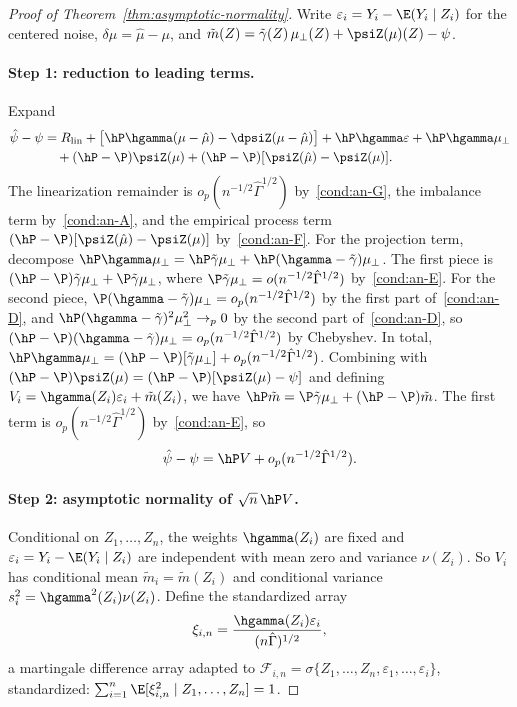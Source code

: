 \documentclass{article}
\begin{document}
\begin{proof}[Proof of Theorem~\ref{thm:asymptotic-normality}]
Write $\varepsilon_i = Y_i - \E(Y_i \mid Z_i)$
for the centered noise,
$\delta\mu = \hat\mu - \mu$,
and
$\tilde m(Z)
  = \tilde\gamma(Z)\, \mu_\perp(Z)
  + \psiZ(\mu)(Z) - \psi$.

\paragraph{Step 1: reduction to leading terms.}
Expand
\begin{align*}
\hat\psi - \psi
&= R_{\mathrm{lin}}
+ \bigl[\hP\hgamma(\mu - \hat\mu)
  - \dpsiZ(\mu - \hat\mu)\bigr]
+ \hP\hgamma\varepsilon
+ \hP\hgamma \mu_\perp \\
&\quad
+ (\hP - \P)\psiZ(\mu)
+ (\hP - \P)[\psiZ(\hat\mu)
  - \psiZ(\mu)].
\end{align*}
The linearization remainder is
$o_p(n^{-1/2}\hat\Gamma^{1/2})$ by~\ref{cond:an-G},
the imbalance term by~\ref{cond:an-A},
and the empirical process term
$(\hP - \P)[\psiZ(\hat\mu) - \psiZ(\mu)]$
by~\ref{cond:an-F}.
For the projection term,
decompose
$\hP\hgamma\mu_\perp
  = \hP\tilde\gamma\mu_\perp
  + \hP(\hgamma - \tilde\gamma)\mu_\perp$.
The first piece is
$(\hP - \P)\tilde\gamma\mu_\perp
  + \P\tilde\gamma\mu_\perp$,
where $\P\tilde\gamma\mu_\perp
  = o(n^{-1/2}\hat\Gamma^{1/2})$
by~\ref{cond:an-E}.
For the second piece,
$\P(\hgamma - \tilde\gamma)\mu_\perp
  = o_p(n^{-1/2}\hat\Gamma^{1/2})$
by the first part of~\ref{cond:an-D},
and $\hP(\hgamma - \tilde\gamma)^2\mu_\perp^2 \to_p 0$
by the second part of~\ref{cond:an-D},
so $(\hP - \P)(\hgamma - \tilde\gamma)\mu_\perp
  = o_p(n^{-1/2}\hat\Gamma^{1/2})$ by Chebyshev.
In total,
$\hP\hgamma\mu_\perp
  = (\hP - \P)[\tilde\gamma\mu_\perp]
  + o_p(n^{-1/2}\hat\Gamma^{1/2})$.
Combining with
$(\hP - \P)\psiZ(\mu) = (\hP - \P)[\psiZ(\mu) - \psi]$
and defining
$V_i = \hgamma(Z_i)\varepsilon_i + \tilde m(Z_i)$,
we have
$\hP \tilde m
  = \P\tilde\gamma\mu_\perp
  + (\hP - \P)\tilde m$.
The first term is
$o_p(n^{-1/2}\hat\Gamma^{1/2})$ by~\ref{cond:an-E}, so
\begin{equation}\label{eq:an-leading}
\hat\psi - \psi
= \hP V + o_p(n^{-1/2}\hat\Gamma^{1/2}).
\end{equation}

\paragraph{Step 2: asymptotic normality of $\sqrt{n}\,\hP V$.}
Conditional on $Z_1, \ldots, Z_n$,
the weights $\hgamma(Z_i)$ are fixed
and $\varepsilon_i = Y_i - \E(Y_i \mid Z_i)$
are independent with mean zero
and variance $\nu(Z_i)$.
So $V_i$ has conditional mean $\tilde m_i = \tilde m(Z_i)$
and conditional variance $s_i^2 = \hgamma^2(Z_i)\nu(Z_i)$.
Define the standardized array
\[
\xi_{i,n}
= \frac{\hgamma(Z_i)\varepsilon_i}
       {(n\hat\Gamma)^{1/2}},
\]
a martingale difference array
adapted to
$\mathcal{F}_{i,n}
= \sigma\{Z_1, \ldots, Z_n,
  \varepsilon_1, \ldots, \varepsilon_i\}$,
standardized:
$\sum_{i=1}^n \E[\xi_{i,n}^2 \mid Z_1, \ldots, Z_n]
= 1$.


\end{proof}
\end{document}
